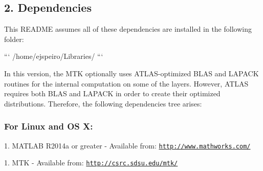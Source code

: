 \begin{DoxyPre}\subsection*{2. Dependencies}\end{DoxyPre}



\begin{DoxyPre}\end{DoxyPre}



\begin{DoxyPre}This README assumes all of these dependencies are installed in the following
folder:\end{DoxyPre}



\begin{DoxyPre}```
/home/ejspeiro/Libraries/
```\end{DoxyPre}



\begin{DoxyPre}In this version, the MTK optionally uses ATLAS-optimized BLAS and LAPACK
routines for the internal computation on some of the layers. However, ATLAS
requires both BLAS and LAPACK in order to create their optimized distributions.
Therefore, the following dependencies tree arises:\end{DoxyPre}



\begin{DoxyPre}\subsubsection*{For Linux and OS X:}\end{DoxyPre}



\begin{DoxyPre}\end{DoxyPre}



\begin{DoxyPre}1. MATLAB R2014a or greater - Available from: \href{http://www.mathworks.com/}{\tt http://www.mathworks.com/}\end{DoxyPre}



\begin{DoxyPre}1. MTK - Available from: \href{http://csrc.sdsu.edu/mtk/}{\tt http://csrc.sdsu.edu/mtk/}


\end{DoxyPre}



